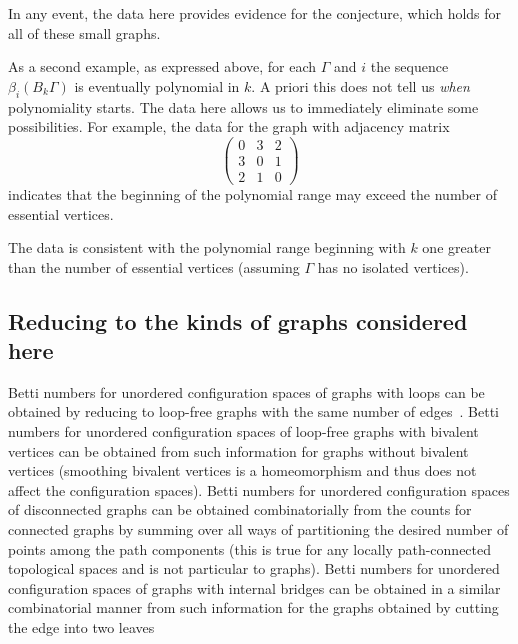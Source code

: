 \documentclass{amsart}
\theoremstyle{definition}
\begin{document}
In any event, the data here provides evidence for the conjecture, which holds for all of these small graphs.

As a second example, as expressed above, for each $\Gamma$ and $i$ the sequence $\beta_i(B_k\Gamma)$ is eventually polynomial in $k$. 
A priori this does not tell us \emph{when} polynomiality starts. 
The data here allows us to immediately eliminate some possibilities. 
For example, the data for the graph with adjacency matrix 
\[\left(\begin{array}{ccc}0&3&2\\3&0&1 \\ 2&1 & 0\end{array}\right)\]
indicates that the beginning of the polynomial range may exceed the number of essential vertices.

The data is consistent with the polynomial range beginning with $k$ one greater than the number of essential vertices (assuming $\Gamma$ has no isolated vertices).


\subsection*{Reducing to the kinds of graphs considered here}
Betti numbers for unordered configuration spaces of graphs with loops can be obtained by reducing to loop-free graphs with the same number of edges~\cite[Lemma 4.6]{AnDrummondColeKnudsen:ESHGBG}. 
Betti numbers for unordered configuration spaces of loop-free graphs with bivalent vertices can be obtained from such information for graphs without bivalent vertices (smoothing bivalent vertices is a homeomorphism and thus does not affect the configuration spaces). 
Betti numbers for unordered configuration spaces of disconnected graphs can be obtained combinatorially from the counts for connected graphs by summing over all ways of partitioning the desired number of points among the path components (this is true for any locally path-connected topological spaces and is not particular to graphs). 
Betti numbers for unordered configuration spaces of graphs with internal bridges can be obtained in a similar combinatorial manner from such information for the graphs obtained by cutting the edge into two leaves~\cite[Proposition 5.22]{AnDrummond-ColeKnudsen:SSGBG}
\end{document}
